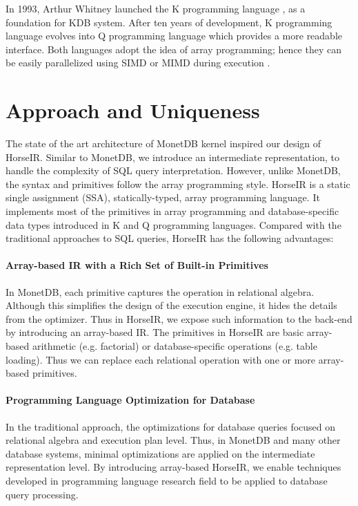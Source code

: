 \documentclass[sigplan]{acmart}
\begin{document}
In 1993, Arthur Whitney launched the K programming language
\cite{KLangTutorial} , as a foundation for KDB system. After ten years of
development, K programming language evolves into Q programming language
\cite{QLangTutorial} which provides a more readable interface. Both languages
adopt the idea of array programming; hence they can be easily parallelized
using SIMD or MIMD during execution \cite{HowFastCanAPLBe}. 


\section{Approach and Uniqueness}

The state of the art architecture of MonetDB kernel inspired our design of
HorseIR. Similar to MonetDB, we introduce an intermediate representation, to
handle the complexity of SQL query interpretation.  However, unlike MonetDB,
the syntax and primitives follow the array programming style. HorseIR is a
static single assignment (SSA), statically-typed, array programming language.
It implements most of the primitives in array programming and
database-specific data types introduced in K and Q programming languages.
Compared with the traditional approaches to SQL queries, HorseIR has the
following advantages:

\paragraph{Array-based IR with a Rich Set of Built-in Primitives} In MonetDB,
each primitive captures the operation in relational algebra. Although this
simplifies the design of the execution engine, it hides the details from the
optimizer. Thus in HorseIR, we expose such information to the back-end by
introducing an array-based IR. The primitives in HorseIR are basic array-based
arithmetic (e.g. factorial) or database-specific operations (e.g. table
loading). Thus we can replace each relational operation with one or more
array-based primitives. 

\paragraph{Programming Language Optimization for Database} In the traditional
approach, the optimizations for database queries focused on relational algebra
and execution plan level. Thus, in MonetDB and many other database systems,
minimal optimizations are applied on the intermediate representation level. By
introducing array-based HorseIR, we enable techniques developed in programming
language research field to be applied to database query processing. 
\end{document}
